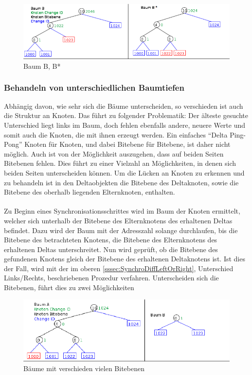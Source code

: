 \documentclass[a4paper,11pt,oneside,%
headsepline,												%
footsepline,												%
bibtotocnumbered									%
]{scrreprt}
\begin{document}
\begin{figure}[h!]
  \begin{center}
    \includegraphics[width=0.9\linewidth]{bilder/Case B Baeume.png}
  \end{center}
 \caption{Baum B, B*}
  \label{fig:Case1TreeB,B*}
\end{figure}
\subsubsection{Behandeln von unterschiedlichen Baumtiefen} 
Abhängig davon, wie sehr sich die Bäume unterscheiden, so verschieden ist auch die Struktur an Knoten. Das führt zu folgender Problematik: Der älteste gesuchte Unterschied liegt links im Baum, doch fehlen ebenfalls andere, neuere Werte und somit auch die Knoten, die mit ihnen erzeugt werden. Ein einfaches \enquote{Delta Ping-Pong} Knoten für Knoten, und dabei Bitebene für Bitebene, ist daher nicht möglich. Auch ist von der Möglichkeit auszugehen, dass auf beiden Seiten Bitebenen fehlen. Dies führt zu einer Vielzahl an Möglichkeiten, in denen sich beiden Seiten unterscheiden können. Um die Lücken an Knoten zu erkennen und zu behandeln ist in den Deltaobjekten die Bitebene des Deltaknoten, sowie die Bitebene des oberhalb liegenden Elternknoten, enthalten.\\\\
Zu Beginn eines Synchronisationsschrittes wird im Baum der Knoten ermittelt, welcher sich unterhalb der Bitebene des Elternknotens des erhaltenen Deltas befindet. Dazu wird der Baum mit der Adresszahl solange durchlaufen, bis die Bitebene des betrachteten Knotens, die Bitebene des Elternknotens des erhaltenen Deltas unterschreitet. Nun wird geprüft, ob die Bitebene des gefundenen Knotens gleich der Bitebene des erhaltenen Deltaknotens ist. Ist dies der Fall, wird mit der im oberen \autoref{sssec:SynchroDiffLeftOrRight}, Unterschied Links/Rechts, beschriebenen Prozedur verfahren. Unterscheiden sich die Bitebenen, führt dies zu zwei Möglichkeiten 
\begin{figure}[h!]
  \begin{center}
    \includegraphics[width=0.9\linewidth]{bilder/case 2 a* B**.png}
  \end{center}
 \caption{Bäume mit verschieden vielen Bitebenen}
\end{figure}\\
\end{document}
